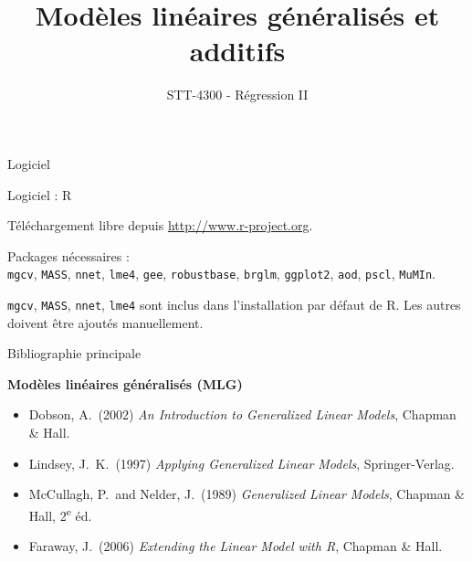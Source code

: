\documentclass{BeamerTemplate}
\title{Modèles linéaires généralisés et additifs}
\subtitle{STT-4300 - Régression II}
\begin{document}
\begin{frame}[t]
	\titlepage
\end{frame}


\begin{frame}{Logiciel}

Logiciel : R

\bigskip

Téléchargement libre depuis
\url{http://www.r-project.org}.

\bigskip
Packages nécessaires :\\
\texttt{mgcv}, \texttt{MASS}, \texttt{nnet}, \texttt{lme4}, \texttt{gee}, \texttt{robustbase}, \texttt{brglm}, \texttt{ggplot2},
\texttt{aod}, \texttt{pscl}, \texttt{MuMIn}.

\bigskip

\texttt{mgcv}, \texttt{MASS}, \texttt{nnet}, \texttt{lme4} sont inclus dans l'installation par défaut de R. Les autres doivent être ajoutés manuellement.

\end{frame}


\begin{frame}{Bibliographie principale}

\textbf{Modèles linéaires généralisés (MLG)}
\begin{itemize}
\item Dobson, A.\ (2002) \textit{An Introduction to Generalized Linear Models}, Chapman \& Hall.
\item Lindsey, J.\ K.\ (1997) \textit{Applying Generalized Linear Models}, Springer-Verlag.
\item McCullagh, P.\ and Nelder, J.\ (1989) \textit{Generalized Linear Models},
Chapman \& Hall, 2\textsuperscript{e} éd.
\item Faraway, J.\ (2006) \textit{Extending the Linear Model with R}, Chapman \& Hall.
\end{itemize}
\end{frame}
\end{document}
